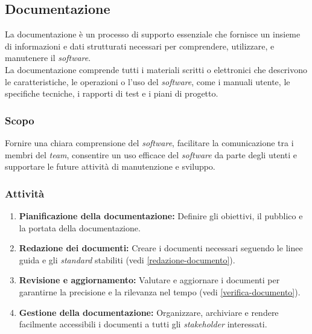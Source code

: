 \subsection{Documentazione}

La documentazione è un processo di supporto essenziale che fornisce un insieme
di informazioni e dati strutturati necessari per comprendere, utilizzare, e
manutenere il \textit{software}.\\
La documentazione comprende tutti i materiali scritti o elettronici che
descrivono le caratteristiche, le operazioni o l'uso del \textit{software},
come i manuali utente, le specifiche tecniche, i rapporti di test e i piani di
progetto.

\subsubsection{Scopo}
Fornire una chiara comprensione del \textit{software}, facilitare la
comunicazione tra i membri del \textit{team}, consentire un uso efficace del
\textit{software} da parte degli utenti e supportare le future attività di
manutenzione e sviluppo.

\subsubsection{Attività}
\begin{enumerate}
	\item \textbf{Pianificazione della documentazione:} Definire gli obiettivi,
	      il pubblico e la portata della documentazione.
	\item \textbf{Redazione dei documenti:} Creare i documenti necessari
	      seguendo le linee guida e gli \textit{standard} stabiliti
	      (vedi \cref{redazione-documento}).
	\item \textbf{Revisione e aggiornamento:} Valutare e aggiornare i documenti
	      per garantirne la precisione e la rilevanza nel tempo (vedi
	      \cref{verifica-documento}).
	\item \textbf{Gestione della documentazione:} Organizzare, archiviare e
	      rendere facilmente accessibili i documenti a tutti gli
	      \textit{stakeholder} interessati.
\end{enumerate}

